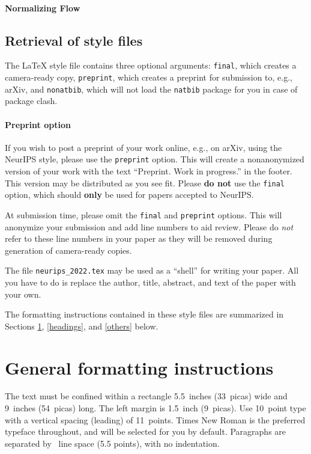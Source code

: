 \documentclass{article}
\begin{document}
\paragraph{Normalizing Flow}

\subsection{Retrieval of style files}

The \LaTeX{} style file contains three optional arguments: \verb+final+, which
creates a camera-ready copy, \verb+preprint+, which creates a preprint for
submission to, e.g., arXiv, and \verb+nonatbib+, which will not load the
\verb+natbib+ package for you in case of package clash.


\paragraph{Preprint option}
If you wish to post a preprint of your work online, e.g., on arXiv, using the
NeurIPS style, please use the \verb+preprint+ option. This will create a
nonanonymized version of your work with the text ``Preprint. Work in progress.''
in the footer. This version may be distributed as you see fit. Please \textbf{do
  not} use the \verb+final+ option, which should \textbf{only} be used for
papers accepted to NeurIPS.


At submission time, please omit the \verb+final+ and \verb+preprint+
options. This will anonymize your submission and add line numbers to aid
review. Please do \emph{not} refer to these line numbers in your paper as they
will be removed during generation of camera-ready copies.


The file \verb+neurips_2022.tex+ may be used as a ``shell'' for writing your
paper. All you have to do is replace the author, title, abstract, and text of
the paper with your own.


The formatting instructions contained in these style files are summarized in
Sections \ref{gen_inst}, \ref{headings}, and \ref{others} below.


\section{General formatting instructions}
\label{gen_inst}


The text must be confined within a rectangle 5.5~inches (33~picas) wide and
9~inches (54~picas) long. The left margin is 1.5~inch (9~picas).  Use 10~point
type with a vertical spacing (leading) of 11~points.  Times New Roman is the
preferred typeface throughout, and will be selected for you by default.
Paragraphs are separated by ~line space (5.5 points), with no
indentation.
\end{document}
